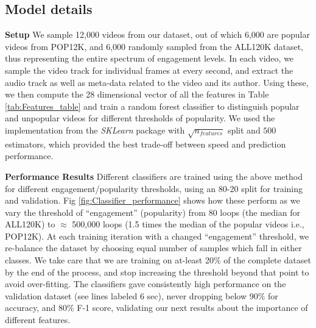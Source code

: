 \subsection{Model details}
\label{sec:model-details}
\noindent\textbf{Setup}
We sample 12,000 videos from our dataset, out of which 6,000 are popular videos from  POP12K, and 6,000 randomly sampled from the ALL120K dataset, thus representing the entire spectrum of engagement levels. In each video, we sample the video track for individual frames at every second, and extract the audio track as well as meta-data related to the video and its author. Using these, we then compute the 28 dimensional vector of all the features in Table \ref{tab:Features_table} and train a random forest classifier to distinguish popular and unpopular videos for different thresholds of popularity. We used the implementation from the \emph{SKLearn} package with $\sqrt{n_{features}}$ split and $500$ estimators, which provided the best trade-off between speed and prediction performance.

\noindent\textbf{Performance Results} 
Different classifiers are trained using the above method for different engagement/popularity thresholds, using an 80-20 split for training and validation. Fig \ref{fig:Classifier_performance} shows how these perform as we vary the threshold of ``engagement'' (popularity) from 80 loops (the median for ALL120K) to  $\approx$ 500,000 loops (1.5 times the median of the popular videos i.e., POP12K). At each training iteration with a changed ``engagement'' threshold, we re-balance the dataset by choosing equal number of samples which fall in either classes. We take care that we are training on at-least 20\% of the complete dataset by the end of the process, and stop increasing the threshold beyond that point to avoid over-fitting. The classifiers gave consistently high performance on the validation dataset (see lines labeled 6 sec), never dropping below 90\% for accuracy, and 80\% F-1 score, validating our next results about the importance of different features. 

